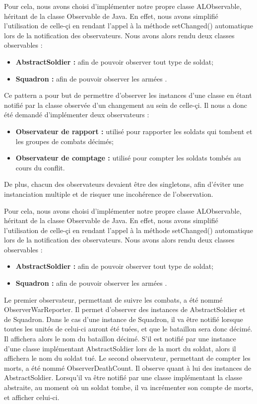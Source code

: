 \documentclass[12pt]{article}
\begin{document}
Pour cela, nous avons choisi d'implémenter notre propre classe ALObservable, héritant de la classe Observable de Java. En effet, nous avons simplifié l'utilisation de celle-çi en rendant l'appel à la méthode setChanged() automatique lors de la notification des observateurs.
Nous avons alors rendu deux classes observables :
\begin{itemize}
\item \textbf{AbstractSoldier :} afin de pouvoir observer tout type de soldat;
\item \textbf{Squadron :} afin de pouvoir observer les armées .
\end{itemize}

Ce pattern a pour but de permettre d'observer les instances d'une classe en étant notifié par la classe observée d'un changement au sein de celle-çi. Il nous a donc été demandé d'implémenter deux observateurs :
\begin{itemize}
\item \textbf{Observateur de rapport :} utilisé pour rapporter les soldats qui tombent et les groupes de combats décimés; 
\item \textbf{Observateur de comptage :} utilisé pour compter les soldats tombés au cours du conflit. 
\end{itemize}
De plus, chacun des observateurs devaient être des singletons, afin d'éviter une instanciation multiple et de risquer une incohérence de l'observation.

Pour cela, nous avons choisi d'implémenter notre propre classe ALObservable, héritant de la classe Observable de Java. En effet, nous avons simplifié l'utilisation de celle-çi en rendant l'appel à la méthode setChanged() automatique lors de la notification des observateurs.
Nous avons alors rendu deux classes observables :
\begin{itemize}
\item \textbf{AbstractSoldier :} afin de pouvoir observer tout type de soldat;
\item \textbf{Squadron :} afin de pouvoir observer les armées .
\end{itemize}

Le premier observateur, permettant de suivre les combats, a été nommé ObserverWarReporter. Il permet d'observer des instances de AbstractSoldier et de Squadron.
Dans le cas d'une instance de Squadron, il va être notifié lorsque toutes les unités de celui-ci auront été tuées, et que le bataillon sera donc décimé. Il affichera alors le nom du bataillon décimé. S'il est notifié par une instance d'une classe implémentant AbstractSoldier lors de la mort du soldat, alors il affichera le nom du soldat tué.
Le second observateur, permettant de compter les morts, a été nommé ObserverDeathCount. Il observe quant à lui des instances de AbstractSoldier. Lorsqu'il va être notifié par une classe implémentant la classe abstraite, au moment où un soldat tombe, il va incrémenter son compte de morts, et afficher celui-ci.
\end{document}
